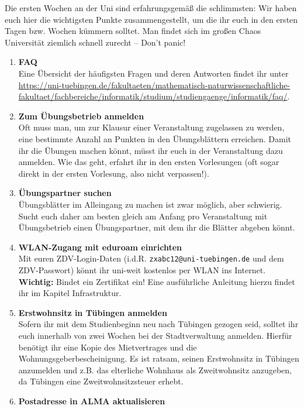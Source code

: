 
Die ersten Wochen an der Uni sind erfahrungsgemäß die schlimmsten: Wir haben euch hier die wichtigsten Punkte zusammengestellt, um die ihr euch in den ersten Tagen bzw. Wochen kümmern solltet. Man findet sich im großen Chaos Universität ziemlich schnell zurecht -- Don't panic!
  
  \begin{enumerate}[label=$\bigcirc$]
  	
  	\item \textbf{FAQ} \\
		Eine Übersicht der häufigsten Fragen und deren Antworten findet ihr unter \url{https://uni-tuebingen.de/fakultaeten/mathematisch-naturwissenschaftliche-fakultaet/fachbereiche/informatik/studium/studiengaenge/informatik/faq/}.
	\item \textbf{Zum Übungsbetrieb anmelden} \\
	  	Oft muss man, um zur Klausur einer Veranstaltung zugelassen zu werden, eine bestimmte Anzahl an Punkten in den Übungsblättern erreichen. Damit ihr die Übungen machen könnt, müsst ihr euch in der Veranstaltung dazu anmelden. Wie das geht, erfahrt ihr in den ersten Vorlesungen (oft sogar direkt in der ersten Vorlesung, also nicht verpassen!).
  	\item \textbf{Übungspartner suchen} \\
	  	Übungsblätter im Alleingang zu machen ist zwar möglich, aber schwierig. Sucht euch daher am besten gleich am Anfang pro Veranstaltung mit Übungsbetrieb einen Übungspartner, mit dem ihr die Blätter abgeben könnt.
  	\item \textbf{WLAN-Zugang mit eduroam einrichten}\\
	  	Mit euren ZDV-Login-Daten (i.d.R. \texttt{zxabc12@uni-tuebingen.de} und dem ZDV-Passwort) könnt ihr uni-weit kostenlos per WLAN ins Internet. \textbf{Wichtig:} Bindet ein Zertifikat ein! Eine ausführliche Anleitung hierzu findet ihr im Kapitel Infrastruktur.
  	\item \textbf{Erstwohnsitz in Tübingen anmelden} \\
	  	Sofern ihr mit dem Studienbeginn neu nach Tübingen gezogen seid, solltet ihr euch innerhalb von zwei Wochen bei der Stadtverwaltung anmelden. Hierfür benötigt ihr eine Kopie des Mietvertrages und die Wohnungsgeberbescheinigung. Es ist ratsam, seinen Erstwohnsitz in Tübingen anzumelden und z.B. das elterliche Wohnhaus als Zweitwohnsitz anzugeben, da Tübingen eine Zweitwohnsitzsteuer erhebt.
	\item \textbf{Postadresse in ALMA aktualisieren}\\

\end{enumerate}

